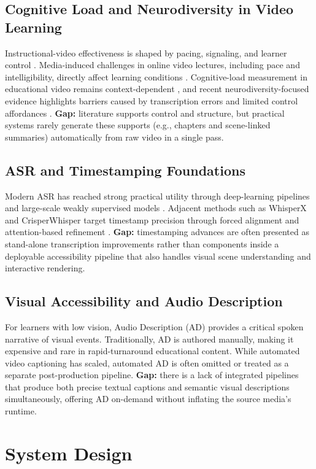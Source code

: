 \documentclass[conference]{IEEEtran}
\begin{document}
\subsection{Cognitive Load and Neurodiversity in Video Learning}
Instructional-video effectiveness is shaped by pacing, signaling, and learner control \cite{Mayer2020,CastroAlonso2021}. Media-induced challenges in online video lectures, including pace and intelligibility, directly affect learning conditions \cite{Lange2020}. Cognitive-load measurement in educational video remains context-dependent \cite{Kruger2016}, and recent neurodiversity-focused evidence highlights barriers caused by transcription errors and limited control affordances \cite{LeCunff2024,Horlin2024}. \textbf{Gap:} literature supports control and structure, but practical systems rarely generate these supports (e.g., chapters and scene-linked summaries) automatically from raw video in a single pass.

\subsection{ASR and Timestamping Foundations}
Modern ASR has reached strong practical utility through deep-learning pipelines \cite{Malik2020} and large-scale weakly supervised models \cite{Radford2022}. Adjacent methods such as WhisperX and CrisperWhisper target timestamp precision through forced alignment and attention-based refinement \cite{Bain2023,Wagner2024}. \textbf{Gap:} timestamping advances are often presented as stand-alone transcription improvements rather than components inside a deployable accessibility pipeline that also handles visual scene understanding and interactive rendering.

\subsection{Visual Accessibility and Audio Description}
For learners with low vision, Audio Description (AD) provides a critical spoken narrative of visual events. Traditionally, AD is authored manually, making it expensive and rare in rapid-turnaround educational content. While automated video captioning has scaled, automated AD is often omitted or treated as a separate post-production pipeline. \textbf{Gap:} there is a lack of integrated pipelines that produce both precise textual captions and semantic visual descriptions simultaneously, offering AD on-demand without inflating the source media's runtime.

\section{System Design}
\end{document}

